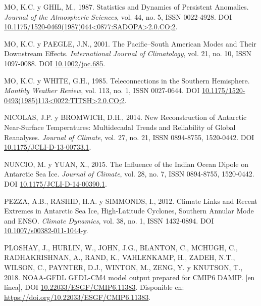 \documentclass[12pt,oneside,a4paper]{reedthesis}
\newlength{\cslhangindent}
\newenvironment{CSLReferences}[2] %
 {%
  \setlength{\parindent}{0pt}
  \ifodd #1 \everypar{\setlength{\hangindent}{\cslhangindent}}\ignorespaces\fi
  \ifnum #2 > 0
  \setlength{\parskip}{#2\baselineskip}
  \fi
 }%
 {}
\begin{document}
\begin{CSLReferences}{1}{0}
\leavevmode{}%
MO, K.C. y GHIL, M., 1987. Statistics and {Dynamics} of {Persistent Anomalies}. \emph{Journal of the Atmospheric Sciences}, vol. 44, no. 5, ISSN 0022-4928. DOI \href{https://doi.org/10.1175/1520-0469(1987)044\%3C0877:SADOPA\%3E2.0.CO;2}{10.1175/1520-0469(1987)044\textless0877:SADOPA\textgreater2.0.CO;2}.

\leavevmode{}%
MO, K.C. y PAEGLE, J.N., 2001. The {Pacific}--{South American} Modes and Their Downstream Effects. \emph{International Journal of Climatology}, vol. 21, no. 10, ISSN 1097-0088. DOI \href{https://doi.org/10.1002/joc.685}{10.1002/joc.685}.

\leavevmode{}%
MO, K.C. y WHITE, G.H., 1985. Teleconnections in the {Southern Hemisphere}. \emph{Monthly Weather Review}, vol. 113, no. 1, ISSN 0027-0644. DOI \href{https://doi.org/10.1175/1520-0493(1985)113\%3C0022:TITSH\%3E2.0.CO;2}{10.1175/1520-0493(1985)113\textless0022:TITSH\textgreater2.0.CO;2}.

\leavevmode{}%
NICOLAS, J.P. y BROMWICH, D.H., 2014. New {Reconstruction} of {Antarctic Near-Surface Temperatures}: {Multidecadal Trends} and {Reliability} of {Global Reanalyses}. \emph{Journal of Climate}, vol. 27, no. 21, ISSN 0894-8755, 1520-0442. DOI \href{https://doi.org/10.1175/JCLI-D-13-00733.1}{10.1175/JCLI-D-13-00733.1}.

\leavevmode{}%
NUNCIO, M. y YUAN, X., 2015. The {Influence} of the {Indian Ocean Dipole} on {Antarctic Sea Ice}. \emph{Journal of Climate}, vol. 28, no. 7, ISSN 0894-8755, 1520-0442. DOI \href{https://doi.org/10.1175/JCLI-D-14-00390.1}{10.1175/JCLI-D-14-00390.1}.

\leavevmode{}%
PEZZA, A.B., RASHID, H.A. y SIMMONDS, I., 2012. Climate Links and Recent Extremes in Antarctic Sea Ice, High-Latitude Cyclones, {Southern Annular Mode} and {ENSO}. \emph{Climate Dynamics}, vol. 38, no. 1, ISSN 1432-0894. DOI \href{https://doi.org/10.1007/s00382-011-1044-y}{10.1007/s00382-011-1044-y}.

\leavevmode{}%
PLOSHAY, J., HURLIN, W., JOHN, J.G., BLANTON, C., MCHUGH, C., RADHAKRISHNAN, A., RAND, K., VAHLENKAMP, H., ZADEH, N.T., WILSON, C., PAYNTER, D.J., WINTON, M., ZENG, Y. y KNUTSON, T., 2018. NOAA-GFDL GFDL-CM4 model output prepared for CMIP6 DAMIP. {[}en línea{]}, DOI \href{https://doi.org/10.22033/ESGF/CMIP6.11383}{10.22033/ESGF/CMIP6.11383}. Disponible en: \url{https://doi.org/10.22033/ESGF/CMIP6.11383}.


\end{CSLReferences}
\end{document}
